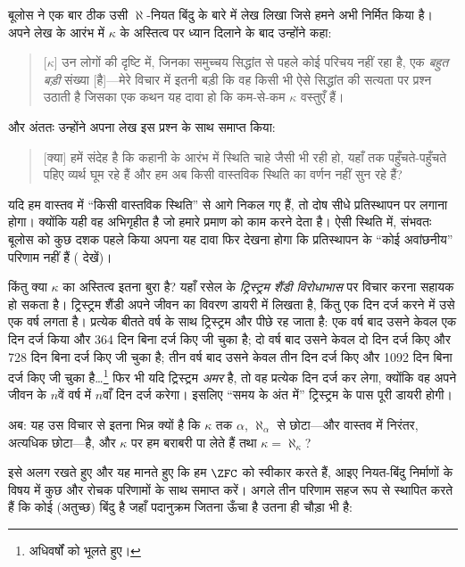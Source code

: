 \documentclass[../../../include/open-logic-section]{subfiles}
\begin{document}
बूलोस ने एक बार ठीक उसी $\aleph$-नियत बिंदु के बारे में लेख लिखा जिसे हमने
अभी निर्मित किया है। अपने लेख के आरंभ में $\kappa$ के अस्तित्व पर ध्यान
दिलाने के बाद उन्होंने कहा:
\begin{quote}
	[$\kappa$] उन लोगों की दृष्टि में, जिनका समुच्चय सिद्धांत से पहले कोई
	परिचय नहीं रहा है, एक \emph{बहुत बड़ी} संख्या [है]---मेरे विचार में इतनी
	बड़ी कि वह किसी भी ऐसे सिद्धांत की सत्यता पर प्रश्न उठाती है जिसका एक
	कथन यह दावा हो कि कम-से-कम $\kappa$ वस्तुएँ हैं।
	\citep[p.~257]{Boolos2000}
\end{quote}
और अंततः उन्होंने अपना लेख इस प्रश्न के साथ समाप्त किया:
\begin{quote}
	[क्या] हमें संदेह है कि कहानी के आरंभ में स्थिति चाहे जैसी भी रही हो,
	यहाँ तक पहुँचते-पहुँचते पहिए व्यर्थ घूम रहे हैं और हम अब किसी वास्तविक
	स्थिति का वर्णन नहीं सुन रहे हैं?
	\citep[p.~268]{Boolos2000}
\end{quote}
यदि हम वास्तव में ``किसी वास्तविक स्थिति'' से आगे निकल गए हैं, तो दोष सीधे
प्रतिस्थापन पर लगाना होगा। क्योंकि यही वह अभिगृहीत है जो हमारे प्रमाण को
काम करने देता है। ऐसी स्थिति में, संभवतः बूलोस को कुछ दशक पहले किया अपना
यह दावा फिर देखना होगा कि प्रतिस्थापन के ``कोई अवांछनीय'' परिणाम नहीं हैं
( देखें)।

किंतु क्या $\kappa$ का अस्तित्व इतना बुरा है? यहाँ रसेल के
\emph{ट्रिस्ट्रम शैंडी विरोधाभास} पर विचार करना सहायक हो सकता है। ट्रिस्ट्रम
शैंडी अपने जीवन का विवरण डायरी में लिखता है, किंतु एक दिन दर्ज करने में उसे
एक वर्ष लगता है। प्रत्येक बीतते वर्ष के साथ ट्रिस्ट्रम और पीछे रह जाता है:
एक वर्ष बाद उसने केवल एक दिन दर्ज किया और 364 दिन बिना दर्ज किए जी चुका है;
दो वर्ष बाद उसने केवल दो दिन दर्ज किए और 728 दिन बिना दर्ज किए जी चुका है;
तीन वर्ष बाद उसने केवल तीन दिन दर्ज किए और 1092 दिन बिना दर्ज किए जी चुका
है\dots\footnote{अधिवर्षों को भूलते हुए।} फिर भी यदि ट्रिस्ट्रम
\emph{अमर} है, तो वह प्रत्येक दिन दर्ज कर लेगा, क्योंकि वह अपने जीवन के
$n$वें वर्ष में $n$वाँ दिन दर्ज करेगा। इसलिए ``समय के अंत में'' ट्रिस्ट्रम
के पास पूरी डायरी होगी।

अब: यह उस विचार से इतना भिन्न क्यों है कि $\kappa$ तक $\alpha$,
$\aleph_\alpha$ से छोटा---और वास्तव में निरंतर, अत्यधिक छोटा---है, और
$\kappa$ पर हम बराबरी पा लेते हैं तथा $\kappa=\aleph_\kappa$?

इसे अलग रखते हुए और यह मानते हुए कि हम $\ZFC$ को स्वीकार करते हैं, आइए
नियत-बिंदु निर्माणों के विषय में कुछ और रोचक परिणामों के साथ समाप्त करें।
अगले तीन परिणाम सहज रूप से स्थापित करते हैं कि कोई (अतुच्छ) बिंदु है जहाँ
पदानुक्रम जितना ऊँचा है उतना ही चौड़ा भी है:
\end{document}
